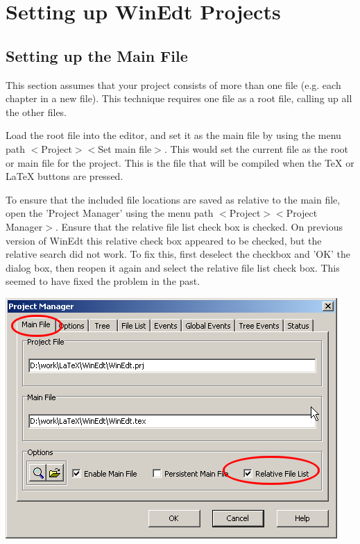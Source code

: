 
\chapter{Setting up WinEdt Projects}


\section{Setting up the Main File}

This section assumes that your project consists of more than one file (e.g. each chapter in a new file).  This technique requires one file as a root file, calling up all the other files.

Load the root file into the editor, and set it as the main file by using the menu path
$<$Project$>$$<$Set main file$>$.
This would set the current file as the root or main file for the project.  This is the file that will be compiled when the TeX or LaTeX buttons are pressed.

To ensure that the included file locations are saved as relative to the  main file, open the 
'Project Manager'  using the menu path $<$Project$>$$<$Project Manager$>$. Ensure that the relative file list check box is checked.  On previous version of WinEdt this relative check box appeared to be checked, but the relative search did not work. To fix this, first deselect the checkbox and 'OK' the dialog box, then reopen it again and select the relative file list check box.  This seemed to have fixed the problem in the past.

\centerline{\includegraphics[bb= 0 0 512 387,scale=0.7]{eps/projectmanager.png}}









